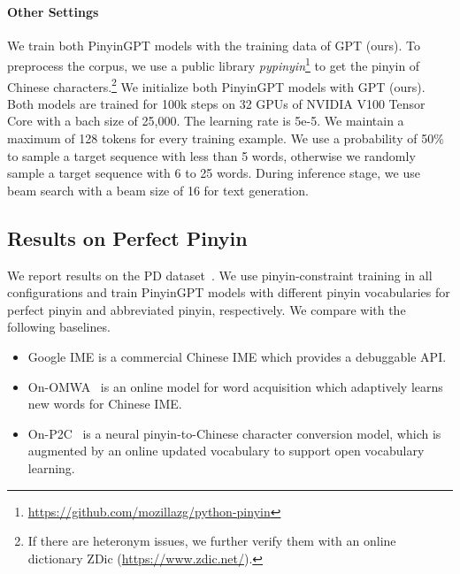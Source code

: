 \paragraph{Other Settings} 

We train both PinyinGPT models with the training data of GPT (ours).
To preprocess the corpus, we use a public library \textit{pypinyin}\footnote{\url{https://github.com/mozillazg/python-pinyin}} to get the pinyin of Chinese characters.\footnote{
If there are heteronym issues, we further verify them with an online dictionary ZDic (\url{https://www.zdic.net/}).}
We initialize both PinyinGPT models with GPT (ours).
Both models are trained  for 100k steps on 32 GPUs of NVIDIA V100 Tensor Core with a bach size of 25,000.
The learning rate is 5e-5.
We maintain a maximum of 128 tokens for every training example.
We use a probability of 50\% to sample a target sequence with less than 5 words, otherwise we randomly sample a target sequence with 6 to 25 words. 
During inference stage, we use beam search with a beam size of 16 for text generation.


\subsection{Results on Perfect Pinyin}
 We report results on the PD dataset~\cite{yang-etal-2012-towards}.
We use pinyin-constraint training in all configurations and train PinyinGPT models with different pinyin vocabularies for perfect pinyin and abbreviated pinyin, respectively.
We compare with the following baselines. 
\begin{itemize}
    \item Google IME is a commercial Chinese IME which provides a debuggable API.
    \item On-OMWA~\cite{zhang-etal-arxiv-tracing} is an online model for word acquisition which adaptively learns new words for Chinese IME. 
    \item On-P2C~\cite{zhang-etal-2019-open} is a neural pinyin-to-Chinese character conversion model, which is augmented by an online updated vocabulary to support open vocabulary learning.
\end{itemize}

